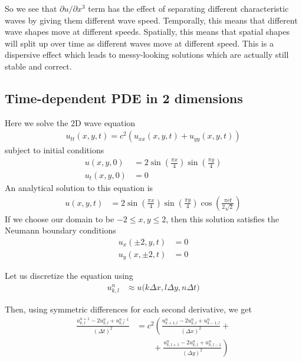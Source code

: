 \documentclass[twocolumn]{myarticle}
\numberwithin{equation}{section}
\begin{document}
So we see that $ \partial u / \partial x^3 $ term has the effect of separating different characteristic waves by giving them different wave speed.
Temporally, this means that different wave shapes move at different speeds.
Spatially, this means that spatial shapes will split up over time as different waves move at different speed.
This is a dispersive effect which leads to messy-looking solutions which are actually still stable and correct.

\subsection{Time-dependent PDE in 2 dimensions}
\label{subsec:time_dependent_pde_in_2_dimensions}

Here we solve the 2D wave equation
\begin{align}
    u_{tt}(x,y,t) = c^2 \left( u_{xx}(x,y,t) + u_{yy}(x,y,t) \right)
\end{align}
subject to initial conditions
\begin{align}
    u(x,y,0) &= 2 \sin \left( \frac{\pi x}{4} \right) \sin \left( \frac{\pi y}{4} \right) \label{eq:init_cond1}
    \\
    u_t(x,y,0) &= 0 \label{eq:init_cond2}
\end{align}
An analytical solution to this equation is
\begin{align}
    u(x,y,t) &= 2 \sin \left( \frac{\pi x}{4} \right) \sin \left( \frac{\pi y}{4} \right) \cos \left( \frac{\pi c t}{2\sqrt{2}} \right)
\end{align}
If we choose our domain to be $ -2 \leq x,y \leq 2 $, then this solution satisfies the Neumann boundary conditions
\begin{align}
    u_x(\pm 2, y, t) &= 0 \label{eq:bound_cond_x}
    \\
    u_y(x, \pm 2, t) &= 0 \label{eq:bound_cond_y}
\end{align}

Let us discretize the equation using
\begin{align}
    u^n_{k,l} &\approx u\big(k \Delta x, l \Delta y, n \Delta t\big)
\end{align}

Then, using symmetric differences for each second derivative, we get
\begin{align}
    \frac{u^{n+1}_{k,l} - 2 u^{n}_{k,l} + u^{n-1}_{k,l}}{\left( \Delta t \right)^2} &= c^2 \left( \frac{u^{n}_{k+1,l} - 2 u^{n}_{k,l} + u^{n}_{k-1,l}}{\left( \Delta x \right)^2} \right. + \nonumber
    \\
    & \qquad + \left. \frac{u^{n}_{k,l+1} - 2 u^{n}_{k,l} + u^{n}_{k,l-1}}{\left( \Delta y \right)^2} \right)
\end{align}
\end{document}
